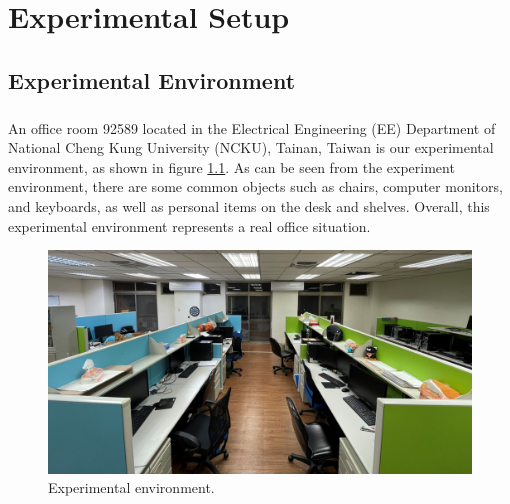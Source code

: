 \documentclass[a4paper,12pt]{report}
\begin{document}
\chapter{Experimental Setup}
\section{Experimental Environment}
\paragraph{}
An office room 92589 located in the Electrical Engineering (EE) Department of National Cheng Kung University (NCKU), Tainan, Taiwan is our experimental environment, as shown in figure \ref{Fig:room_92589}. As can be seen from the experiment environment, there are some common objects such as chairs, computer monitors, and keyboards, as well as personal items on the desk and shelves. Overall, this experimental environment represents a real office situation.
\begin{figure}[htbp]
    \begin{center}
    \includegraphics[width=\columnwidth]{images/chap4/room_92589.png}
    \caption{Experimental environment.}
    \label{Fig:room_92589}
    \end{center}
\end{figure}
\end{document}
